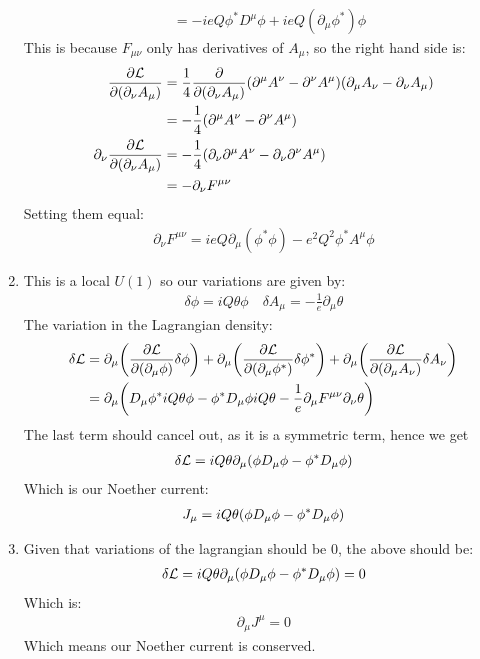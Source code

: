 \documentclass[12pt]{article}
\renewcommand{\L}{\mathcal{L}}
\newcommand{\D}{\partial}
\newcommand{\munu}{{\mu\nu}}
\begin{document}
\begin{enumerate}[label=\alph*)]
\begin{align*}
    &=-ieQ\phi^*D^\mu\phi+ieQ(\D_\mu\phi^*)\phi
  \end{align*}
  This is because $F_\munu$ only has derivatives of $A_\mu$, so the right hand side is:
  \begin{align*}
    \pdv{\L}{(\D_\nu A_\mu)}&=\frac{1}{4}\pdv{(\D_\nu A_\mu)}
    \qty(\D^\mu A^\nu-\D^\nu A^\mu)(\D_\mu A_\nu-\D_\nu A_\mu)\\
    &=-\frac{1}{4}\qty(\D^\mu A^\nu-\D^\nu A^\mu)\\
    \D_\nu\pdv{\L}{(\D_\nu A_\mu)}&=
    -\frac{1}{4}\qty(\D_\nu\D^\mu A^\nu-\D_\nu\D^\nu A^\mu)\\
    &=-\D_\nu F^\munu
  \end{align*}
  Setting them equal:
  \begin{align*}
    \D_\nu F^\munu=ieQ\D_\mu(\phi^*\phi)-e^2Q^2\phi^*A^\mu\phi
  \end{align*}
\item This is a local $U(1)$ so our variations are given by:
  \begin{align*}
    \delta\phi=iQ\theta\phi\quad
    \delta A_\mu=-\frac{1}{e}\D_\mu\theta
  \end{align*}
  The variation in the Lagrangian density:
  \begin{align*}
    \delta\L&=\D_\mu\qty(\pdv{\L}{(\D_\mu\phi)}\delta\phi)+
    \D_\mu\qty(\pdv{\L}{(\D_\mu\phi^*)}\delta\phi^*)
    +\D_\mu\qty(\pdv{\L}{(\D_\mu A_\nu)}\delta A_\nu)\\
    &=\D_\mu\qty(D_\mu\phi^*iQ\theta\phi-\phi^*D_\mu\phi iQ\theta
    -\frac{1}{e}\D_\mu F^\munu\D_\nu\theta)
  \end{align*}
  The last term should cancel out, as it is a symmetric term, hence we get
  \begin{align*}
    \delta\L=iQ\theta\D_\mu\qty(\phi D_\mu\phi-\phi^* D_\mu\phi)
  \end{align*}
  Which is our Noether current:
  \begin{align*}
    J_\mu=iQ\theta\qty(\phi D_\mu\phi-\phi^* D_\mu\phi)
  \end{align*}
\item Given that variations of the lagrangian should be $0$, the above should be:
  \begin{align*}
    \delta\L=iQ\theta\D_\mu\qty(\phi D_\mu\phi-\phi^* D_\mu\phi)=0
  \end{align*}
  Which is:
  \begin{align*}
    \D_\mu J^\mu=0
  \end{align*}
  Which means our Noether current is conserved.
\end{enumerate}
\end{document}
